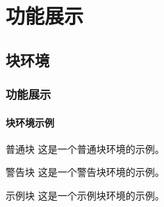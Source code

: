 \section{功能展示}
\subsection{块环境}
\begin{frame}
\frametitle{功能展示}
\framesubtitle{块环境示例}

\begin{block}{普通块}
这是一个普通块环境的示例。
\end{block}

\begin{alertblock}{警告块}
这是一个警告块环境的示例。
\end{alertblock}

\begin{exampleblock}{示例块}
这是一个示例块环境的示例。
\end{exampleblock}
\end{frame}